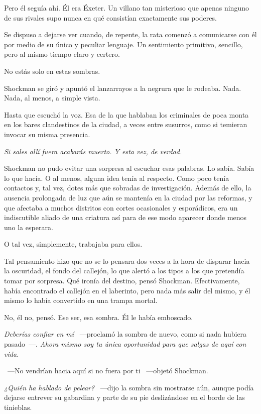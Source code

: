 Pero él seguía ahí. Él era Éxeter. Un villano tan misterioso que apenas ninguno de sus rivales supo nunca en qué consistían exactamente sus poderes.

Se dispuso a dejarse ver cuando, de repente, la rata comenzó a comunicarse con él por medio de su único y peculiar lenguaje. Un sentimiento primitivo, sencillo, pero al mismo tiempo claro y certero.

No estás solo en estas sombras.

Shockman se giró y apuntó el lanzarrayos a la negrura que le rodeaba. Nada. Nada, al menos, a simple vista.

Hasta que escuchó la voz. Esa de la que hablaban los criminales de poca monta en los bares clandestinos de la ciudad, a veces entre susurros, como si temieran invocar su misma presencia.

\emph{Si sales allí fuera acabarás muerto. Y esta vez, de verdad.}

Shockman no pudo evitar una sorpresa al escuchar esas palabras. Lo sabía. Sabía lo que hacía. O al menos, alguna idea tenía al respecto. Como poco tenía contactos y, tal vez, dotes más que sobradas de investigación. Además de ello, la ausencia prolongada de luz que aún se mantenía en la ciudad por las reformas, y que afectaba a muchos distritos con cortes ocasionales y esporádicos, era un indiscutible aliado de una criatura así para de ese modo aparecer donde menos uno la esperara.

O tal vez, simplemente, trabajaba para ellos.

Tal pensamiento hizo que no se lo pensara dos veces a la hora de disparar hacia la oscuridad, el fondo del callejón, lo que alertó a los tipos a los que pretendía tomar por sorpresa. Qué ironía del destino, pensó Shockman. Efectivamente, había encontrado el callejón en el laberinto, pero nada más salir del mismo, y él mismo lo había convertido en una trampa mortal.

No, él no, pensó. Ese ser, esa sombra. Él le había emboscado.

\emph{Deberías confiar en mí} ~---proclamó la sombra de nuevo, como si nada hubiera pasado~---. \emph{Ahora mismo soy tu única oportunidad para que salgas de aquí con vida.}

~---No vendrían hacia aquí si no fuera por ti ~---objetó Shockman.

\emph{¿Quién ha hablado de pelear?} ~---dijo la sombra sin mostrarse aún, aunque podía dejarse entrever su gabardina y parte de su pie deslizándose en el borde de las tinieblas.


